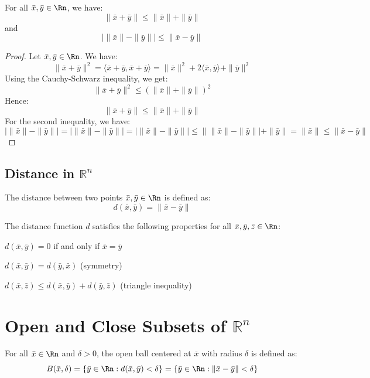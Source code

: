 \begin{theorem}
    For all $\bar{x}, \bar{y} \in \Rn$, we have:
    \[
        \|\bar{x} + \bar{y}\| \leq \|\bar{x}\| + \|\bar{y}\|
    \]
    and \[
        |\|\bar{x}\| - \|\bar{y}\|| \leq \|\bar{x} - \bar{y}\|
    \]
\end{theorem}
\begin{proof}
    Let $\bar{x}, \bar{y} \in \Rn$. We have:
    \[
        \|\bar{x} + \bar{y}\|^2 = \langle \bar{x} + \bar{y}, \bar{x} + \bar{y} \rangle = \|\bar{x}\|^2 + 2\langle \bar{x}, \bar{y} \rangle + \|\bar{y}\|^2
    \]
    Using the Cauchy-Schwarz inequality, we get:
    \[
        \|\bar{x} + \bar{y}\|^2 \leq (\|\bar{x}\| + \|\bar{y}\|)^2
    \]
    Hence:
    \[
        \|\bar{x} + \bar{y}\| \leq \|\bar{x}\| + \|\bar{y}\|
    \]
    For the second inequality, we have:
    \[
        |\|\bar{x}\| - \|\bar{y}\|| = |\|\bar{x}\| - \|\bar{y}\|| = |\|\bar{x}\| - \|\bar{y}\|| \leq \|\|\bar{x}\| - \|\bar{y}\|| + \|\bar{y}\| = \|\bar{x}\| \leq \|\bar{x} - \bar{y}\|
    \]
\end{proof}

\subsection{Distance in $\mathbb{R}^n$}
\begin{definition}[Distance]
    The distance between two points $\bar{x}, \bar{y} \in \Rn$ is defined as:
    \[
        d(\bar{x}, \bar{y}) = \|\bar{x} - \bar{y}\|
    \]
\end{definition}
The distance function $d$ satisfies the following properties for all $\bar{x}, \bar{y}, \bar{z} \in \Rn$:
\begin{citemize}
    \item $d(\bar{x}, \bar{y}) = 0$ if and only if $\bar{x} = \bar{y}$
    \item $d(\bar{x}, \bar{y}) = d(\bar{y}, \bar{x})$ (symmetry)
    \item $d(\bar{x}, \bar{z}) \leq d(\bar{x}, \bar{y}) + d(\bar{y}, \bar{z})$ (triangle inequality)
\end{citemize}

\section{Open and Close Subsets of $\mathbb{R}^n$}
\begin{definition}
    For all $\bar{x} \in \Rn$ and $\delta > 0$, the open ball centered at $\bar{x}$ with radius $\delta$ is defined as:
    \[
        B(\bar{x}, \delta) = \{\bar{y} \in \Rn : d(\bar{x}, \bar{y}) < \delta\} = \{\bar{y} \in \Rn : \|\bar{x} - \bar{y}\| < \delta\}
    \]
\end{definition}

